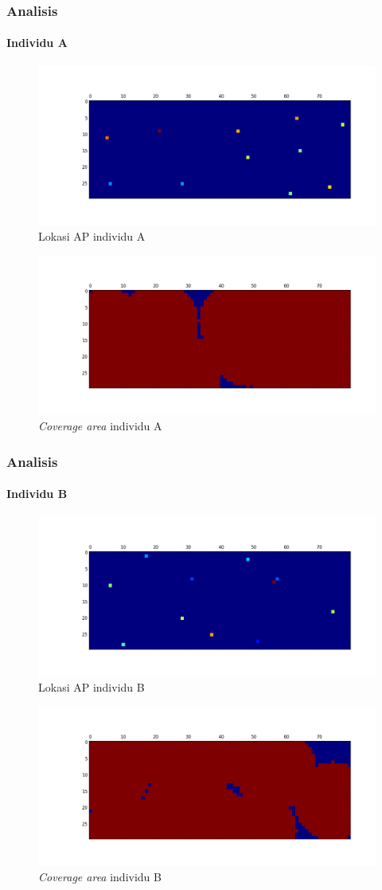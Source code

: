 \documentclass[12pt]{beamer}
\begin{document}
	\begin{frame}
		\frametitle{Analisis}
		\framesubtitle{Individu A}
		\begin{figure}[t]
		\centering
		\includegraphics[width=0.5\linewidth]{apLoc_02}
		\caption{Lokasi AP individu A}
		\label{fig:apLoc_02}
		\end{figure}
		\begin{figure}[t]
			\centering
			\includegraphics[width=0.5\linewidth]{coverage_02}
			\caption{\emph{Coverage area} individu A}
			\label{fig:coverage_02}
		\end{figure}
	\end{frame}

	\begin{frame}
		\frametitle{Analisis}
		\framesubtitle{Individu B}
		\begin{figure}[t]
			\centering
			\includegraphics[width=0.5\linewidth]{apLoc_05}
			\caption{Lokasi AP individu B}
			\label{fig:apLoc_05}
		\end{figure}
		\begin{figure}[t]
			\centering
			\includegraphics[width=0.5\linewidth]{coverage_05}
			\caption{\emph{Coverage area} individu B}
			\label{fig:coverage_05}
		\end{figure}
	\end{frame}
	
\end{document}
